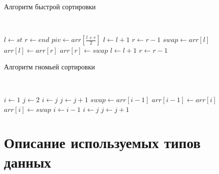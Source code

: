 \begin{algorithm}[H]
    \caption{Алгоритм быстрой сортировки}
    \label{alg:q-sort}
    \\

    \begin{algorithmic}[1]
        \State $l\gets st$
        \State $r\gets end$
        \State $piv\gets arr[\frac{l + r}{2}]$
                \State $l\gets l + 1$
            \EndWhile
                \State $r\gets r - 1$
            \EndWhile
                \State $swap\gets arr[l]$
                \State $arr[l]\gets arr[r]$
                \State $arr[r]\gets swap$
                \State $l\gets l + 1$
                \State $r\gets r - 1$
            \EndIf
        \EndWhile
            \State {}
        \EndIf
            \State {}
        \EndIf
        \EndProcedure
    \end{algorithmic}
\end{algorithm}

\begin{algorithm}[H]
    \caption{Алгоритм гномьей сортировки}
    \label{alg:gnome-sort}
    \\

    \begin{algorithmic}[1]
        \State $i\gets 1$
        \State $j\gets 2$
                \State $i\gets j$
                \State $j\gets j + 1$
            \Else
                \State $swap\gets arr[i - 1]$
                \State $arr[i - 1]\gets arr[i]$
                \State $arr[i]\gets swap$
                \State $i\gets i - 1$
                    \State $i\gets j$
                    \State $j\gets j + 1$
                \EndIf
            \EndIf
        \EndWhile
        \EndProcedure
    \end{algorithmic}
\end{algorithm}

\section{Описание используемых типов данных}


